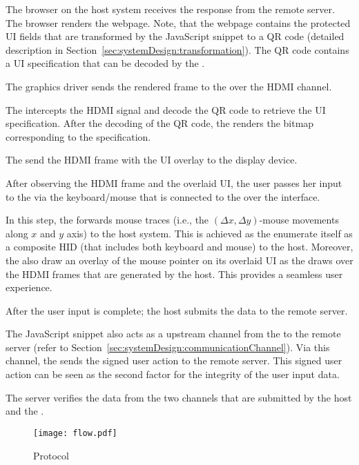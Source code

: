 \begin{mylist}
  \item[\one] The browser on the host system receives the response from the remote server. The browser renders the webpage. Note, that the webpage contains the protected UI fields that are transformed by the \name JavaScript snippet to a QR code (detailed description in Section~\ref{sec:systemDesign:transformation}). The QR code contains a UI specification that can be decoded by the \device.
  \item[\two] The graphics driver sends the rendered frame to the \device over the HDMI channel.
  \item[\three] The \device intercepts the HDMI signal and decode the QR code to retrieve the UI specification. After the decoding of the QR code, the \device renders the bitmap corresponding to the specification.
  \item[\four] The \device send the HDMI frame with the UI overlay to the display device.
  \item[\five] After observing the HDMI frame and the overlaid UI, the user passes her input to the \device via the keyboard/mouse that is connected to the \device over the \usb interface.
  \item[\six] In this step, the \device forwards mouse traces (i.e., the $(\Delta x,\Delta y)$-mouse movements along $x$ and $y$ axis) to the host system. This is achieved as the \device enumerate itself as a composite HID (that includes both keyboard and mouse) to the host. Moreover, the \device also draw an overlay of the mouse pointer on its overlaid UI as the \device draws over the HDMI frames that are generated by the host. This provides a seamless user experience.
  \item[\seven] After the user input is complete; the host submits the data to the remote server.
  \item[\eight] The \name JavaScript snippet also acts as a upstream channel from the \device to the remote server (refer to Section~\ref{sec:systemDesign:communicationChannel}). Via this channel, the \device sends the signed user action to the remote server. This signed user action can be seen as the second factor for the integrity of the user input data.
  \item [\nine] The server verifies the data from the two channels that are submitted by the host and the \device. 
\end{mylist}



\begin{figure}[t]
\centering
\texttt{[image: flow.pdf]}
\caption{Protocol}
\label{fig:protocol}
\end{figure}




